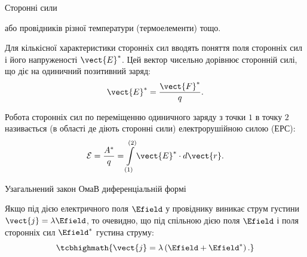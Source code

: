 \documentclass[onlytextwidth]{beamer}
\begin{document}
\begin{frame}{Сторонні сили}{}
\begin{overprint}
\begin{block}{}
			або провідників різної температури (термоелементи) тощо.
		\end{block}
		\begin{block}{}\justifying\small
			Для кількісної характеристики сторонніх сил вводять поняття \alert{поля сторонніх сил і його напруженості} $\vect{E}^*$. Цей вектор чисельно
			дорівнює
			сторонній силі, що діє на одиничний позитивний заряд:
			\begin{equation*}
				\vect{E}^* = \frac{\vect{F}^*}q.
			\end{equation*}
		\end{block}
		Робота сторонніх сил по переміщенню одиничного заряду з точки $1$ в точку $2$ називається (в області де діють сторонні сили) \alert{електрорушійною
			силою (ЕРС)}:
		\begin{equation*}
			\mathcal{E} = \frac{A^*}{q} = \int\limits_{(1)}^{(2)}\vect{E}^*\cdot d\vect{r}.
		\end{equation*}
	\end{overprint}
\end{frame}


\begin{frame}{Узагальнений закон Ома}{В диференціальній формі}
	\begin{block}{}\justifying
		Якщо під дією електричного поля $\Efield$  у провіднику виникає струм густини $\vect{j} = \lambda\Efield$, то очевидно, що під спільною дією
		поля $\Efield$
		і поля сторонніх сил $\Efield^*$ густина струму:
		\begin{equation*}
			\tcbhighmath{\vect{j} = \lambda\left(\Efield + \Efield^*\right).}
		\end{equation*}
	\end{block}
\end{frame}
\end{document}
